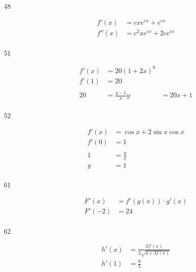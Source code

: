 \documentclass[letterpaper, landscape]{exam}
\begin{document}
\begin{description}
    \item[48] 
      \begin{align*}
        f'(x)  & = cx e^{cx} + e^{cx} \\
        f''(x) & = c^2 x e^{cx} + 2 c e^{cx} \\
      \end{align*}


    \item[51] 
      \begin{align*}
        f'(x) & = 20 (1 + 2x)^9 \\
        f'(1) & = 20 \\
        \\
        20    & = \frac{y - 1}{x}
        y     & = 20x + 1 \\
      \end{align*}

    \item[52] 
      \begin{align*}
        f'(x) & = \cos x + 2 \sin x \cos x \\
        f'(0) & = 1 \\
        \\
        1     & = \frac{y}{x} \\
        y     & = 1 \\
      \end{align*}

    \item[61] 
      \begin{align*}
        F'(x)  & = f'(g(x)) \cdot g'(x) \\
        F'(-2) & = \boxed{ 24 } \\
      \end{align*}

    \item[62] 
      \begin{align*}
        h'(x) &= \frac{3 f'(x)}{2 \sqrt{4 + 3 f(x)}} \\
        h'(1) &= \boxed{ \frac{6}{5} } \\
      \end{align*}


\end{description}
\end{document}
